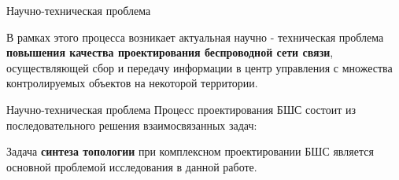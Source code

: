 
\begin{frame}
    {Научно-техническая проблема}
    \justifying

    В рамках этого процесса возникает актуальная научно - техническая проблема \textbf{повышения качества проектирования беспроводной сети связи}, осуществляющей сбор и передачу информации в центр  управления с множества контролируемых объектов на некоторой территории. 

\end{frame}


\begin{frame}
    {Научно-техническая проблема}
    Процесс проектирования БШС состоит из последовательного решения взаимосвязанных задач:
    
    \bigskip

        



    \bigskip
    
    Задача \textbf{синтеза топологии} при комплексном проектировании БШС является основной проблемой исследования в данной работе.

\end{frame}

